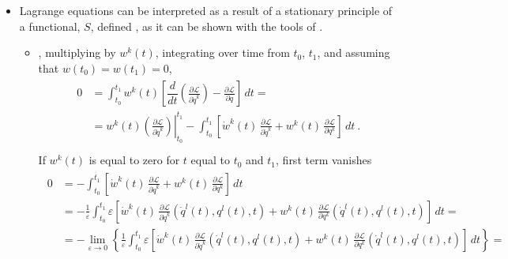 \documentclass[letterpaper,10pt,english]{jupyterBook}
\begin{document}
\begin{itemize}
\item {} 
\sphinxAtStartPar
Lagrange equations can be interpreted as a result of a stationary principle of a functional, \(S\), defined , as it can be shown with the tools of .
\begin{itemize}
\item {} 
\sphinxAtStartPar
{}, multiplying by \(w^k(t)\), integrating over time from \(t_0\), \(t_1\), and assuming that \(w(t_0) = w(t_1) = 0\),
\begin{equation*}
\begin{split}\begin{aligned}
         0 & = \int_{t_0}^{t_1} w^k (t) \left[ \dfrac{d}{dt}\left( \frac{\partial \mathscr{L}}{\partial \dot{q}^k} \right) - \frac{\partial \mathscr{L}}{\partial q} \right] \, dt = \\
           & = w^k(t) \left.\left( \frac{\partial \mathscr{L}}{\partial \dot{q}^k} \right)\right|_{t_0}^{t_1} - \int_{t_0}^{t_1} \left[ \dot{w}^k(t) \, \frac{\partial \mathscr{L}}{\partial \dot{q}^k} + w^k(t) \, \frac{\partial \mathscr{L}}{\partial q^k} \right] \, dt \ . \\
     \end{aligned}\end{split}
\end{equation*}
\sphinxAtStartPar
If \(w^k(t)\) is equal to zero for \(t\) equal to \(t_0\) and \(t_1\), first term vanishes
\begin{equation*}
\begin{split}\begin{aligned}
           0 & = - \int_{t_0}^{t_1} \left[ \dot{w}^k(t) \, \frac{\partial \mathscr{L}}{\partial \dot{q}^k} + w^k(t) \, \frac{\partial \mathscr{L}}{\partial q^k} \right] \, dt \\
           & = - \frac{1}{\varepsilon} \int_{t_0}^{t_1} \varepsilon \left[ \dot{w}^k(t) \, \frac{\partial \mathscr{L}}{\partial \dot{q}^k}\left(\dot{q}^l(t), q^l(t), t \right) + w^k(t) \, \frac{\partial \mathscr{L}}{\partial q^k}\left(\dot{q}^l(t), q^l(t), t \right) \right] \, dt = \\
           & = - \lim_{\varepsilon \rightarrow 0} \left\{ \frac{1}{\varepsilon} \int_{t_0}^{t_1} \varepsilon \left[ \dot{w}^k(t) \, \frac{\partial \mathscr{L}}{\partial \dot{q}^k}\left(\dot{q}^l(t), q^l(t), t \right) + w^k(t) \, \frac{\partial \mathscr{L}}{\partial q^k}\left(\dot{q}^l(t), q^l(t), t \right) \right] \, dt \right\}= \\

\end{aligned}
\end{split}
\end{equation*}
\end{itemize}
\end{itemize}
\end{document}
